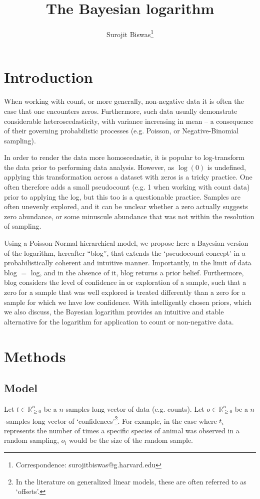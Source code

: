 \documentclass[11pt]{article}
\author[1]{Surojit Biswas\thanks{Correspondence: surojitbiswas@g.harvard.edu}}
\affil[1]{Department of Biomedical Informatics. Harvard Medical School. Boston, MA 02215. USA.}
\date{}
\title{The Bayesian logarithm}
\begin{document}
\maketitle

\section{Introduction}
When working with count, or more generally, non-negative data it is often the case that one encounters zeros. Furthermore, such data usually demonstrate considerable heteroscedasticity, with variance increasing in mean -- a consequence of their governing probabilistic processes (e.g. Poisson, or Negative-Binomial sampling). 

In order to render the data more homoscedastic, it is popular to log-transform the data prior to performing data analysis. However, as $\log(0)$ is undefined, applying this transformation across a dataset with zeros is a tricky practice. One often therefore adds a small pseudocount (e.g. 1 when working with count data) prior to applying the log, but this too is a questionable practice. Samples are often unevenly explored, and it can be unclear whether a zero actually suggests zero abundance, or some minuscule abundance that was not within the resolution of sampling. 

Using a Poisson-Normal hierarchical model, we propose here a Bayesian version of the logarithm, hereafter ``blog'', that extends the `pseudocount concept' in a probabilistically coherent and intuitive manner. Importantly, in the limit of data blog $=$ log, and in the absence of it, blog returns a prior belief. Furthermore, blog considers the level of confidence in or exploration of a sample, such that a zero for a sample that was well explored is treated differently than a zero for a sample for which we have low confidence. With intelligently chosen priors, which we also discuss, the Bayesian logarithm provides an intuitive and stable alternative for the logarithm for application to count or non-negative data.

\section{Methods}

\subsection{Model}
Let $t \in \mathbb{R}_{\geq 0}^n$ be a $n$-samples long vector of data (e.g. counts). Let $o \in \mathbb{R}_{\geq 0}^n$ be a $n$-samples long vector of `confidences'\footnote[2]{In the literature on generalized linear models, these are often referred to as `offsets'.}. For example, in the case where $t_i$ represents the number of times a specific species of animal was observed in a random sampling, $o_i$ would be the size of the random sample. 
\end{document}
